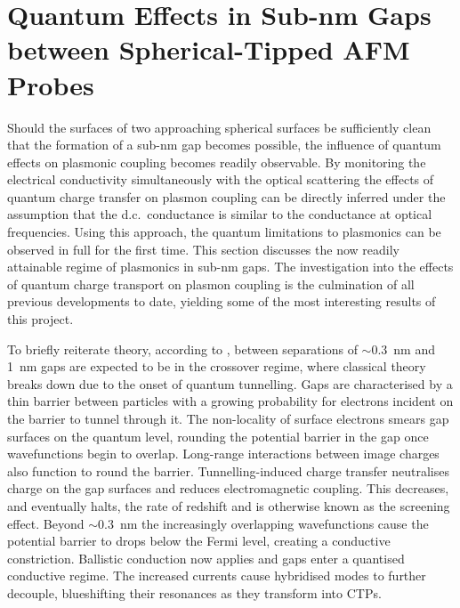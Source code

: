 \documentclass[a4paper, 11pt]{article}
\begin{document}
\section{Quantum Effects in Sub-nm Gaps between Spherical-Tipped AFM Probes}

Should the surfaces of two approaching spherical surfaces be sufficiently clean that the formation of a sub-nm gap becomes possible, the influence of quantum effects on plasmonic coupling becomes readily observable. By monitoring the electrical conductivity simultaneously with the optical scattering the effects of quantum charge transfer on plasmon coupling can be directly inferred under the assumption that the d.c.\ conductance is similar to the conductance at optical frequencies. %
Using this approach, the quantum limitations to plasmonics can be observed in full for the first time.
This section discusses the now readily attainable regime of plasmonics in sub-nm gaps. The investigation into the effects of quantum charge transport on plasmon coupling is the culmination of all previous developments to date, yielding some of the most interesting results of this project.

To briefly reiterate theory, according to \cite{zuloaga2009}, between separations of $\sim$\SI{0.3}{nm} and \SI{1}{nm} gaps are expected to be in the crossover regime, where classical theory breaks down due to the onset of quantum tunnelling. Gaps are characterised by a thin barrier between particles with a growing probability for electrons incident on the barrier to tunnel through it. The non-locality of surface electrons smears gap surfaces on the quantum level, rounding the potential barrier in the gap once wavefunctions begin to overlap. Long-range interactions between image charges also function to round the barrier. Tunnelling-induced charge transfer neutralises charge on the gap surfaces and reduces electromagnetic coupling. This decreases, and eventually halts, the rate of redshift and is otherwise known as the screening effect. Beyond $\sim$\SI{0.3}{nm} the increasingly overlapping wavefunctions cause the potential barrier to drops below the Fermi level, creating a conductive constriction. Ballistic conduction now applies and gaps enter a quantised conductive regime. The increased currents cause hybridised modes to further decouple, blueshifting their resonances as they transform into CTPs.
\end{document}
